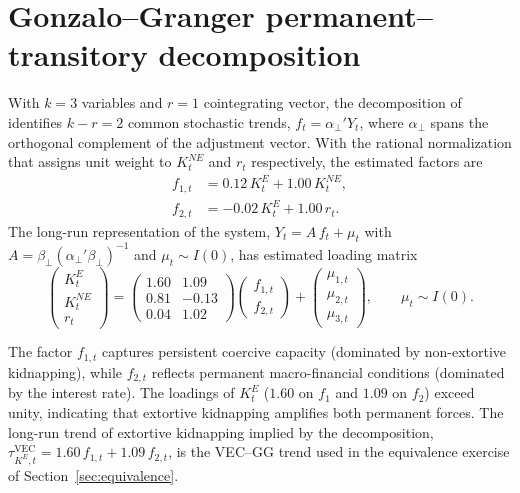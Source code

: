 \documentclass[12pt]{article}
\numberwithin{equation}{section}
\numberwithin{table}{section}
\theoremstyle{definition}
\newcommand{\KE}{K^{E}}
\newcommand{\KNE}{K^{NE}}
\begin{document}
\section{Gonzalo--Granger permanent--transitory decomposition}
\label{sec:gg}

With $k=3$ variables and $r=1$ cointegrating vector, the decomposition of
\citet{GonzaloGranger1995} identifies $k-r=2$ common stochastic trends,
$f_t = \alpha_\perp' Y_t$, where $\alpha_\perp$ spans the orthogonal
complement of the adjustment vector. With the rational normalization that
assigns unit weight to $\KNE_t$ and $r_t$ respectively, the estimated
factors are
\begin{align}
f_{1,t} &= 0.12\,\KE_t + 1.00\,\KNE_t ,
\label{eq:gg-f1}\\
f_{2,t} &= -0.02\,\KE_t + 1.00\,r_t .
\label{eq:gg-f2}
\end{align}
The long-run representation of the system,
$Y_t = A\,f_t + \mu_t$ with $A = \beta_\perp(\alpha_\perp'\beta_\perp)^{-1}$
and $\mu_t \sim I(0)$, has estimated loading matrix
\begin{equation}
\begin{pmatrix} \KE_t \\[2pt] \KNE_t \\[2pt] r_t \end{pmatrix}
=
\begin{pmatrix}
1.60 & 1.09 \\
0.81 & -0.13 \\
0.04 & 1.02
\end{pmatrix}
\begin{pmatrix} f_{1,t} \\[2pt] f_{2,t} \end{pmatrix}
+
\begin{pmatrix} \mu_{1,t} \\[2pt] \mu_{2,t} \\[2pt] \mu_{3,t} \end{pmatrix},
\qquad \mu_t \sim I(0).
\label{eq:gg-loading}
\end{equation}

The factor $f_{1,t}$ captures persistent coercive capacity (dominated by
non-extortive kidnapping), while $f_{2,t}$ reflects permanent macro-financial
conditions (dominated by the interest rate). The loadings of $\KE_t$
($1.60$ on $f_1$ and $1.09$ on $f_2$) exceed unity, indicating that
extortive kidnapping amplifies both permanent forces. The long-run trend of
extortive kidnapping implied by the decomposition,
$\tau^{\mathrm{VEC}}_{\KE,t} = 1.60\,f_{1,t} + 1.09\,f_{2,t}$, is the
VEC--GG trend used in the equivalence exercise of
Section~\ref{sec:equivalence}.
\end{document}
